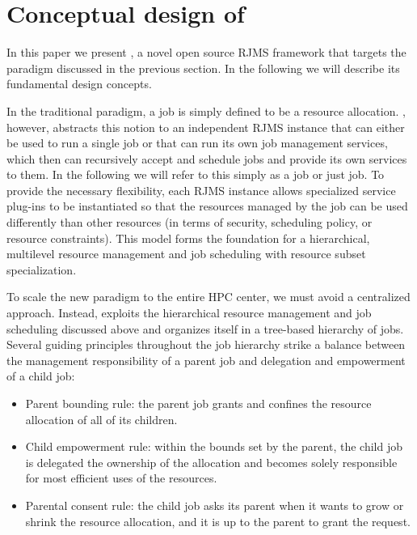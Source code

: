 \section{Conceptual design of \flux}
\label{models}

In this paper we present \flux, a novel open source RJMS framework that
targets the paradigm discussed in the previous section. In the following
we will describe its
%
fundamental design
concepts.

\vspace{1ex}
 In the traditional paradigm, 
a job is simply defined to be a resource allocation. 
\flux, however, abstracts this notion to an independent 
RJMS instance that can either be used to run a single job
or that can 
run its own job management services,
which then can recursively accept and schedule jobs and provide its own 
services to them. 
In the following we will refer to this simply as a \flux job or just job.
To provide the necessary flexibility,
each RJMS instance 
allows specialized service
plug-ins to be instantiated so that the resources managed by the job
can be used differently than other resources (in terms of security, scheduling policy, or resource constraints).
This model forms 
the foundation for a hierarchical,
multilevel resource management and job scheduling
with resource subset specialization.

\vspace{1ex}
 To scale the new paradigm 
to the entire HPC center, we must avoid a centralized approach. 
Instead, \flux exploits the hierarchical resource management 
and job scheduling discussed above and organizes itself in a tree-based hierarchy of \flux jobs. 
Several guiding principles throughout the job hierarchy strike 
a balance between the management responsibility 
of a parent job and delegation and empowerment of a child job:

\begin{itemize}
\item{Parent bounding rule: the parent job grants 
and confines the resource allocation of all of its children.}

\item{Child empowerment rule: within the bounds set 
by the parent, the child job is delegated the ownership 
of the allocation and becomes solely responsible 
for most efficient uses of the resources.}

\item{Parental consent rule: the child job asks 
its parent when it wants to grow or shrink the resource 
allocation, and it is up to the parent to grant the request.}
\end{itemize}

